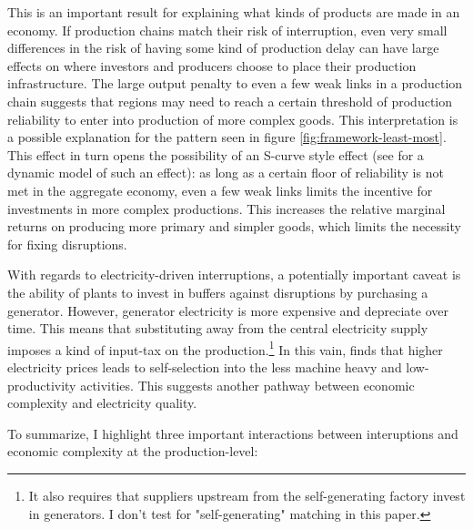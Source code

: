 \documentclass[11pt]{article}
\begin{document}
  This is an important result for explaining what kinds of products are made in an economy. If production chains match their risk of interruption, even very small differences in the risk of having some kind of production delay can have large effects on where investors and producers choose to place their production infrastructure. The large output penalty to even a few weak links in a production chain suggests that regions may need to reach a certain threshold of production reliability to enter into production of more complex goods. This interpretation is a possible explanation for the pattern seen in figure \ref{fig:framework-least-most}. This effect in turn opens the possibility of an S-curve style effect (see \cite{brummitt_contagious_2017} for a dynamic model of such an effect): as long as a certain floor of reliability is not met in the aggregate economy, even a few weak links limits the incentive for investments in more complex productions. This increases the relative marginal returns on producing more primary and simpler goods, which limits the necessity for fixing disruptions.

With regards to electricity-driven interruptions, a potentially important caveat is the ability of plants to invest in buffers against disruptions by purchasing a generator. However, generator electricity is more expensive and depreciate over time. This means that substituting away from the central electricity supply imposes a kind of input-tax on the production.\footnote{It also requires that suppliers upstream from the self-generating factory invest in generators. I don't test for "self-generating" matching in this paper.} In this vain, \cite{abeberese_electricity_2017} finds that higher electricity prices leads to self-selection into the less machine heavy and low-productivity activities. This suggests another pathway between economic complexity and electricity quality. 

To summarize, I highlight three important interactions between interuptions and economic complexity at the production-level:
\end{document}
